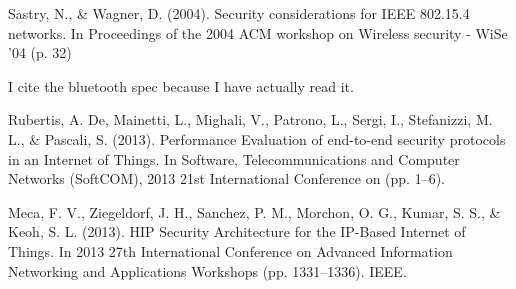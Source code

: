 \documentclass[10pt,journal,compsoc]{IEEEtran}
\begin{document}
\begin{thebibliography}{1}
Sastry, N., \& Wagner, D. (2004). Security considerations for IEEE 802.15.4 networks. In Proceedings of the 2004 ACM workshop on Wireless security - WiSe ’04 (p. 32)

I cite the bluetooth spec because I have actually read it.
 
Rubertis, A. De, Mainetti, L., Mighali, V., Patrono, L., Sergi, I., Stefanizzi, M. L., \& Pascali, S. (2013). Performance Evaluation of end-to-end security protocols in an Internet of Things. In Software, Telecommunications and Computer Networks (SoftCOM), 2013 21st International Conference on (pp. 1–6). 

Meca, F. V., Ziegeldorf, J. H., Sanchez, P. M., Morchon, O. G., Kumar, S. S., \& Keoh, S. L. (2013). HIP Security Architecture for the IP-Based Internet of Things. In 2013 27th International Conference on Advanced Information Networking and Applications Workshops (pp. 1331–1336). IEEE. 

\end{thebibliography}



\end{document}
